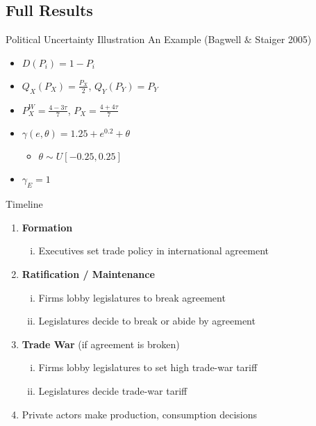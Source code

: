 \documentclass[handout]{beamer}
\newcommand{\ga}{\gamma}
\newcommand{\ta}{\theta}
\begin{document}
\subsection{Full Results}
\begin{frame}{Political Uncertainty Illustration}
\pause
An Example (Bagwell $\&$ Staiger 2005)
\pause
\begin{itemize}[<+->]
	\item $D(P_i) = 1 - P_i$
	\item $Q_X(P_X) = \frac{P_X}{2}$, $Q_Y(P_Y) = P_Y$
	\item $P_X^W = \frac{4-3\tau}{7}$, $P_X = \frac{4+4\tau}{7}$
	\item $\ga(e,\ta) = 1.25 + e^{0.2} + \ta$ 
		\begin{itemize}
			\item $\ta \sim U[-0.25,0.25]$
		\end{itemize}
	\item $\ga_E = 1$
\end{itemize}

\end{frame}


\begin{frame}{Timeline}
\begin{enumerate}
	\item {\color{gray} \textbf{Formation}}
		\begin{enumerate}[i.]
			\item {\color{gray} Executives set trade policy in international agreement}
		\end{enumerate}
	\item \textbf{Ratification / Maintenance}
		\begin{enumerate}[i.]
			\item {\color{gray} Firms lobby legislatures to break agreement}
			\item Legislatures decide to break or abide by agreement
		\end{enumerate}
	\item {\color{gray} \textbf{Trade War} (if agreement is broken)}
		\begin{enumerate}[i.]
			\item {\color{gray} Firms lobby legislatures to set high trade-war tariff}
			\item {\color{gray} Legislatures decide trade-war tariff}
		\end{enumerate}
	\item {\color{gray} Private actors make production, consumption decisions}
\end{enumerate}
\end{frame}
\end{document}
